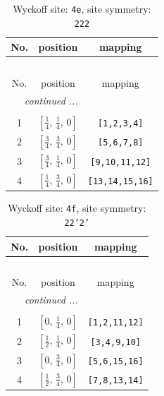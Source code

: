 \documentclass[fleqn,8pt]{jsarticle}
\begin{document}
\renewcommand{\arraystretch}{1.2}
\begin{longtable}{ccc}
\caption{Wyckoff site: {\tt 4e}, site symmetry: {\tt 222}}
 \\
 \hline \hline
No. & position & mapping \\ \hline \endfirsthead

\multicolumn{2}{l}{\tablename\ \thetable{}} \\
 \hline \hline
No. & position & mapping \\ \hline \endhead

 \hline \hline
\multicolumn{2}{r}{\footnotesize\it continued ...} \\ \endfoot

 \hline \hline
\multicolumn{2}{r}{} \\ \endlastfoot

1 & $\left[ \frac{1}{4},\, \frac{1}{4},\, 0 \right]$ & {\tt [1,2,3,4]} \\ \hline
2 & $\left[ \frac{3}{4},\, \frac{3}{4},\, 0 \right]$ & {\tt [5,6,7,8]} \\ \hline
3 & $\left[ \frac{3}{4},\, \frac{1}{4},\, 0 \right]$ & {\tt [9,10,11,12]} \\ \hline
4 & $\left[ \frac{1}{4},\, \frac{3}{4},\, 0 \right]$ & {\tt [13,14,15,16]} \\
\end{longtable}
\renewcommand{\arraystretch}{1.2}
\begin{longtable}{ccc}
\caption{Wyckoff site: {\tt 4f}, site symmetry: {\tt 22'2'}}
 \\
 \hline \hline
No. & position & mapping \\ \hline \endfirsthead

\multicolumn{2}{l}{\tablename\ \thetable{}} \\
 \hline \hline
No. & position & mapping \\ \hline \endhead

 \hline \hline
\multicolumn{2}{r}{\footnotesize\it continued ...} \\ \endfoot

 \hline \hline
\multicolumn{2}{r}{} \\ \endlastfoot

1 & $\left[ 0,\, \frac{1}{4},\, 0 \right]$ & {\tt [1,2,11,12]} \\ \hline
2 & $\left[ \frac{1}{2},\, \frac{1}{4},\, 0 \right]$ & {\tt [3,4,9,10]} \\ \hline
3 & $\left[ 0,\, \frac{3}{4},\, 0 \right]$ & {\tt [5,6,15,16]} \\ \hline
4 & $\left[ \frac{1}{2},\, \frac{3}{4},\, 0 \right]$ & {\tt [7,8,13,14]} \\
\end{longtable}
\end{document}
